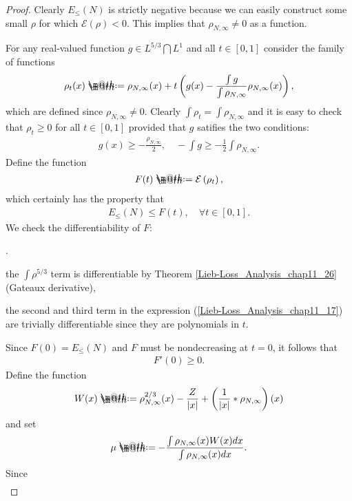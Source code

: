 \documentclass[openany, a4paper, oneside]{book}
\makeatletter
\newcounter{enum2}
\renewenvironment{enumerate}{%
\begin{list}%
{%
\arabic{enum2}.\ \,%
}%
{%
\usecounter{enum2}
\setlength{\itemindent}{0pt}%
\setlength{\leftmargin}{6pt}%
\setlength{\rightmargin}{0pt}%
\setlength{\labelsep}{0pt}%
\setlength{\labelwidth}{6pt}%
\setlength{\itemsep}{0pt}%
\setlength{\parsep}{0pt}%
\setlength{\listparindent}{0pt}%
}
}{%
\end{list}%
}
\newcommand*{\defeq}{\mathrel{\rlap{%
\raisebox{0.3ex}{$\m@th\cdot$}}%
\raisebox{-0.3ex}{$\m@th\cdot$}}%
=}
\theoremstyle{break}
\theoremstyle{breakdefn}
\newcommand{\abs}[1]{\left|#1\right|}
\newcommand{\rbk}[1]{\left (#1\right)}
\newcommand{\sqbk}[1]{\left[#1\right]}
\newcommand{\calE}{\mathcal{E}}
\newcommand{\EleqN}{E_{\leq}(N)}
\newcommand{\rhoNinfty}{\rho_{N, \infty}}
\makeatother
\begin{document}
\begin{proof}
Clearly $\EleqN$ is strictly negative because we can easily construct some small $\rho$ for which $\calE (\rho) < 0$.
This implies that $\rhoNinfty \neq 0$ as a function.

For any real-valued function $g \in L^{5/3} \bigcap L^1$ and all $t \in [0, 1]$ consider the family of functions
\begin{align}
 \rho_t (x)
 \defeq
 \rhoNinfty (x) + t \rbk{ g (x) - \frac{\int g}{\int \rhoNinfty} \rhoNinfty (x)},
\end{align}
which are defined since $\rhoNinfty \neq 0$.
Clearly $\int \rho_t = \int \rhoNinfty$ and it is easy to check that $\rho_t \geq 0$ for all $t \in \sqbk{0, 1}$
provided that $g$ satifies the two conditions:
\begin{align}
 g (x) \geq - \frac{\rhoNinfty}{2}, \quad
 -\int g \geq - \frac{1}{2} \int \rhoNinfty.
\end{align}
Define the function
\begin{align}
 F (t)
 \defeq
 \calE \rbk{\rho_t},
\end{align}
which certainly has the property that
\begin{align}
 \EleqN
 \leq
 F (t),
 \quad \forall t \in \sqbk{0, 1}. \label{Lieb-Loss_Analysis_chap11_27}
\end{align}
We check the differentiability of $F$:
\begin{enumerate}
\item the $\int \rho^{5/3}$ term is differentiable by Theorem \ref{Lieb-Loss_Analysis_chap11_26} (Gateaux derivative),
\item the second and third term in the expression (\ref{Lieb-Loss_Analysis_chap11_17}) are trivially differentiable
   since they are polynomials in $t$.
\end{enumerate}
Since $F (0) = \EleqN$ and $F$ must be nondecreasing at $t=0$, it follows that
\begin{align}
 F'(0)
 \geq 0.
\end{align}
Define the function
\begin{align}
 W (x)
 \defeq
 \rhoNinfty^{2/3}(x) - \frac{Z}{\abs{x}} + \rbk{\frac{1}{\abs{x}} * \rhoNinfty} (x)
\end{align}
and set
\begin{align}
 \mu
 \defeq
 -\frac{\int \rhoNinfty (x) W (x) dx}{\int \rhoNinfty (x) dx}. \label{Lieb-Loss_Analysis_chap11_30}
\end{align}
Since
\begin{align}

\end{align}
\end{proof}
\end{document}
